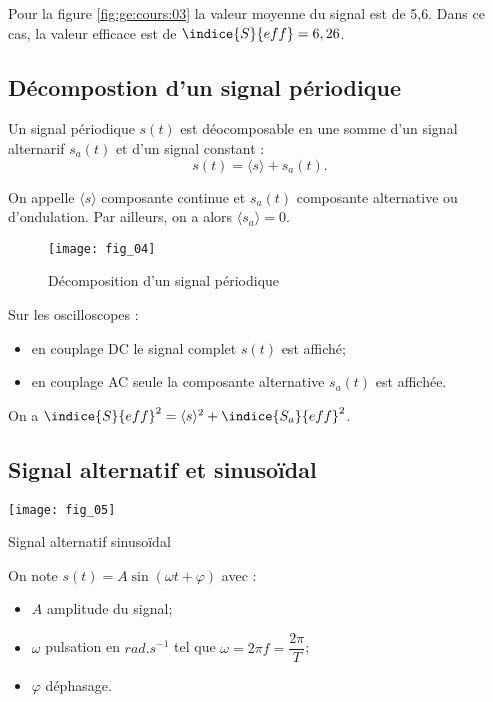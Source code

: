 Pour la figure \ref{fig:ge:cours:03} la valeur moyenne du signal est de 5,6. Dans ce cas, la valeur efficace est de $\indice{S}{eff} = 6,26$.

\subsection{Décompostion d'un signal périodique}
\begin{prop}
Un signal périodique $s(t)$ est déocomposable en une somme d'un signal alternarif $s_a(t)$ et d'un signal constant : 
$$ s(t)= \langle s \rangle + s_a(t) .$$

On appelle  $\langle s \rangle$ composante continue et $s_a(t)$ composante alternative ou d'ondulation. Par ailleurs, on a alors $\langle s_a \rangle = 0$. 
\end{prop}

\begin{figure}[!h]
\texttt{[image: fig\_04]}
\caption{Décomposition d'un signal périodique\label{fig:ge:cours:04}}
\end{figure}

Sur les oscilloscopes : 
\begin{itemize}
\item en couplage DC le signal complet $s(t)$ est affiché;
\item en couplage AC seule la composante alternative $s_a(t)$ est affichée.
\end{itemize}

On a $\indice{S}{eff}^2 = \langle s \rangle^2 + \indice{S_a}{eff}^2$.

\subsection{Signal alternatif et sinusoïdal}

\begin{marginfigure}
\texttt{[image: fig\_05]}
\caption{Signal alternatif sinusoïdal \label{fig:ge:cours:05}}
\end{marginfigure}
\begin{defi}
On note $s(t)=A\sin\left(\omega t + \varphi\right)$ avec : 
\begin{itemize}
\item  $A$ amplitude du signal;
\item  $\omega$ pulsation en $\si{rad.s^{-1}}$ tel que $\omega = 2\pi f = \dfrac{2\pi}{T}$;
\item  $\varphi$  déphasage.
\end{itemize}
\end{defi}


